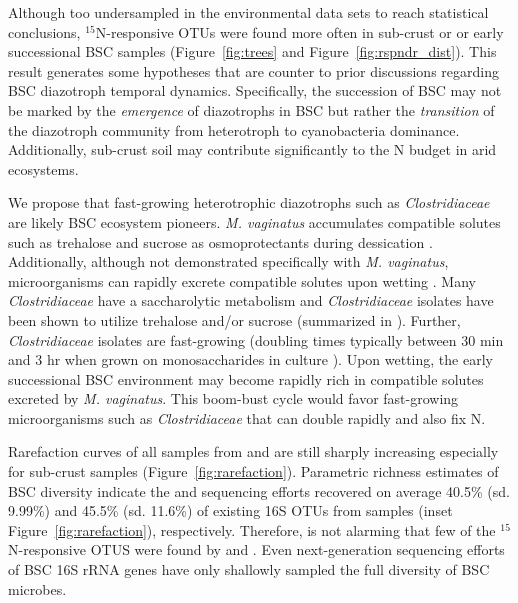 Although too undersampled in the environmental data sets to reach statistical
conclusions, $^{15}$N-responsive OTUs were found more often in sub-crust or
or early successional BSC samples (Figure~\ref{fig:trees} and
Figure~\ref{fig:rspndr_dist}).  This result generates some hypotheses that are
counter to prior discussions regarding BSC diazotroph temporal dynamics.
Specifically, the succession of BSC may not be marked by the \textit{emergence}
of diazotrophs in BSC but rather the \textit{transition} of the diazotroph
community from heterotroph to cyanobacteria dominance. Additionally,
sub-crust soil may contribute significantly to the N budget in arid ecosystems.

We propose that fast-growing heterotrophic diazotrophs such as
\textit{Clostridiaceae} are likely BSC ecosystem pioneers. \textit{M.
vaginatus} accumulates compatible solutes such as trehalose and sucrose as
osmoprotectants during dessication \citep{Rajeev_2013}. Additionally, although
not demonstrated specifically with \textit{M. vaginatus}, microorganisms can
rapidly excrete compatible solutes upon wetting \citep{Poolman_1998}. Many
\textit{Clostridiaceae} have a saccharolytic metabolism \citep{Wiegel_2006} and
\textit{Clostridiaceae} isolates have been shown to utilize trehalose and/or
sucrose (summarized in \citet{Wiegel_2006}). Further, \textit{Clostridiaceae}
isolates are fast-growing (doubling times typically between 30 min and 3 hr
when grown on monosaccharides in culture \citep{Wiegel_2006}). Upon wetting,
the early successional BSC environment may become rapidly rich in compatible
solutes excreted by \textit{M. vaginatus}. This boom-bust cycle would favor
fast-growing microorganisms such as \textit{Clostridiaceae} that can double
rapidly and also fix N.

Rarefaction curves of all samples from \citet{Steven_2013} and
\citet{Garcia_Pichel_2013} are still sharply increasing especially for
sub-crust samples (Figure~\ref{fig:rarefaction}). Parametric richness estimates
of BSC diversity indicate the \citet{Steven_2013} and
\citet{Garcia_Pichel_2013} sequencing efforts recovered on average 40.5\% (sd.
9.99\%) and 45.5\% (sd.  11.6\%) of existing 16S OTUs from samples (inset
Figure~\ref{fig:rarefaction}), respectively. Therefore,
is not alarming that few of the $^{15}$N-responsive OTUS were found by
\citet{Garcia_Pichel_2013} and \citet{Steven_2013}. Even next-generation
sequencing efforts of BSC 16S rRNA genes have only shallowly sampled the full
diversity of BSC microbes.  


